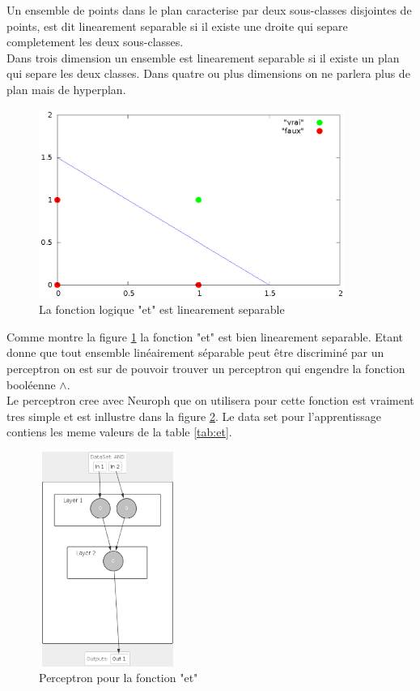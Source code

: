 \documentclass[twoside,openright,a4paper,11pt,french]{article}
\begin{document}
Un ensemble de points dans le plan caracterise par deux sous-classes disjointes
de points, est dit linearement separable si il existe une droite qui separe
completement les deux sous-classes.\\

Dans trois dimension un ensemble est linearement separable si il existe un plan
qui separe les deux classes. Dans quatre ou plus dimensions on ne parlera plus de
plan mais de hyperplan.


\begin{figure}[ht]
\centering
\includegraphics[width=10cm]{./pics/and/and.eps}
\caption{La fonction logique "et" est linearement separable}
\label{fig:and}
\end{figure}


Comme montre la figure \ref{fig:and} la fonction "et" est bien linearement
separable. Etant donne que tout ensemble linéairement séparable peut être
discriminé par un perceptron on est sur de pouvoir trouver un perceptron qui
engendre la fonction booléenne $\land$.\\

Le perceptron cree avec Neuroph que on utilisera pour cette fonction 
est vraiment tres simple et est inllustre dans la figure \ref{fig:per_and}.
Le data set pour l'apprentissage contiens les meme valeurs de la table
\ref{tab:et}.

\begin{figure}[ht]
\centering
\includegraphics[width=4.5cm,height=7cm]{./pics/perc_and.eps}
\caption{Perceptron pour la fonction "et"}
\label{fig:per_and}
\end{figure}
\end{document}

